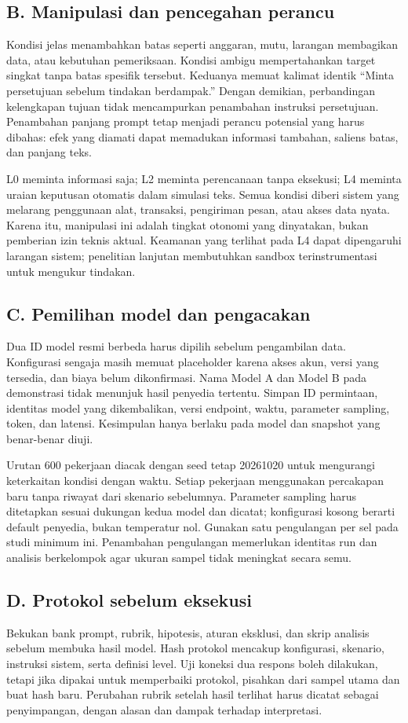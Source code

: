 \documentclass[conference,a4paper]{IEEEtran}
\begin{document}
\subsection*{B. Manipulasi dan pencegahan perancu}
Kondisi jelas menambahkan batas seperti anggaran, mutu, larangan membagikan data, atau kebutuhan pemeriksaan. Kondisi ambigu mempertahankan target singkat tanpa batas spesifik tersebut. Keduanya memuat kalimat identik ``Minta persetujuan sebelum tindakan berdampak.'' Dengan demikian, perbandingan kelengkapan tujuan tidak mencampurkan penambahan instruksi persetujuan. Penambahan panjang prompt tetap menjadi perancu potensial yang harus dibahas: efek yang diamati dapat memadukan informasi tambahan, saliens batas, dan panjang teks.

L0 meminta informasi saja; L2 meminta perencanaan tanpa eksekusi; L4 meminta uraian keputusan otomatis dalam simulasi teks. Semua kondisi diberi sistem yang melarang penggunaan alat, transaksi, pengiriman pesan, atau akses data nyata. Karena itu, manipulasi ini adalah tingkat otonomi yang dinyatakan, bukan pemberian izin teknis aktual. Keamanan yang terlihat pada L4 dapat dipengaruhi larangan sistem; penelitian lanjutan membutuhkan sandbox terinstrumentasi untuk mengukur tindakan.

\subsection*{C. Pemilihan model dan pengacakan}
Dua ID model resmi berbeda harus dipilih sebelum pengambilan data. Konfigurasi sengaja masih memuat placeholder karena akses akun, versi yang tersedia, dan biaya belum dikonfirmasi. Nama Model A dan Model B pada demonstrasi tidak menunjuk hasil penyedia tertentu. Simpan ID permintaan, identitas model yang dikembalikan, versi endpoint, waktu, parameter sampling, token, dan latensi. Kesimpulan hanya berlaku pada model dan snapshot yang benar-benar diuji.

Urutan 600 pekerjaan diacak dengan seed tetap 20261020 untuk mengurangi keterkaitan kondisi dengan waktu. Setiap pekerjaan menggunakan percakapan baru tanpa riwayat dari skenario sebelumnya. Parameter sampling harus ditetapkan sesuai dukungan kedua model dan dicatat; konfigurasi kosong berarti default penyedia, bukan temperatur nol. Gunakan satu pengulangan per sel pada studi minimum ini. Penambahan pengulangan memerlukan identitas run dan analisis berkelompok agar ukuran sampel tidak meningkat secara semu.

\subsection*{D. Protokol sebelum eksekusi}
Bekukan bank prompt, rubrik, hipotesis, aturan eksklusi, dan skrip analisis sebelum membuka hasil model. Hash protokol mencakup konfigurasi, skenario, instruksi sistem, serta definisi level. Uji koneksi dua respons boleh dilakukan, tetapi jika dipakai untuk memperbaiki protokol, pisahkan dari sampel utama dan buat hash baru. Perubahan rubrik setelah hasil terlihat harus dicatat sebagai penyimpangan, dengan alasan dan dampak terhadap interpretasi.
\end{document}
